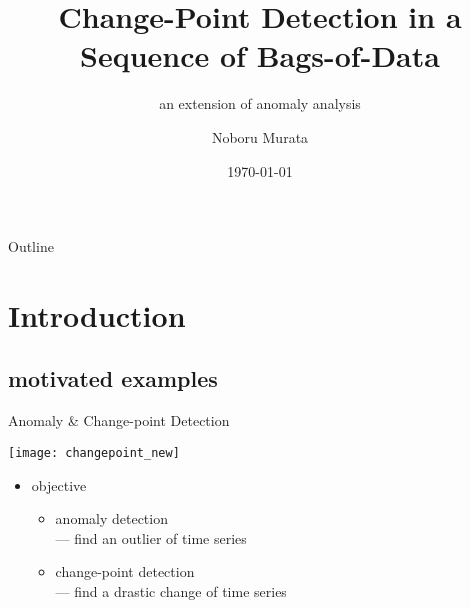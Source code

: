 \documentclass[fleqn,aspectratio=1610]{beamer}
\author{Noboru Murata}
\date{\today}
\title{Change-Point Detection in a Sequence of Bags-of-Data}
\subtitle{an extension of anomaly analysis}
\institute{\url{https://noboru-murata.github.io/}}
\begin{document}
\maketitle
\begin{frame}{Outline}
\tableofcontents
\end{frame}


\section{Introduction}
\label{sec:org86564c3}
\subsection{motivated examples}
\label{sec:org0741ec2}
\begin{frame}[label={sec:org44b06e5},t]{Anomaly \& Change-point Detection}
\begin{center}
\texttt{[image: changepoint\_new]}
\end{center}
\begin{itemize}
\item objective
\begin{itemize}
\item anomaly detection \\[0pt]
--- find an outlier of time series
\item \alert{change-point detection} \\[0pt]
--- find a drastic change of time series
\end{itemize}
\end{itemize}
\end{frame}
\end{document}
